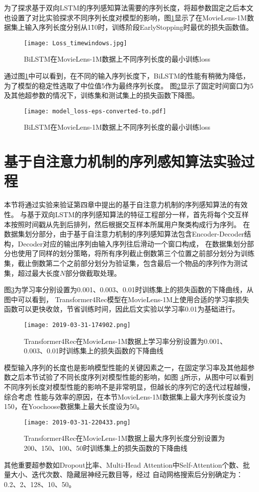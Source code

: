 为了探求基于双向LSTM的序列感知算法需要的序列长度，将超参数固定之后本文也设置了对比实验探求不同序列长度对模型的影响，图\ref{fig:windows}显示了在MovieLens-1M数据集上输入序列长度分别从1\~10时，训练阶段EarlyStopping时最优的损失函数值。
\begin{figure}[htb]%
  \centering
  \texttt{[image: Loss\_timewindows.jpg]}
  \caption{BiLSTM在MovieLens-1M数据上不同序列长度的最小训练loss}
  \label{fig:windows}
\end{figure}
通过图\ref{fig:windows}中可以看到，在不同的输入序列长度下，BiLSTM的性能有稍微为降低，为了模型的稳定性选取了中位值5作为最终序列长度。
图\ref{fig:BiLSTMloss}显示了固定时间窗口为5及其他超参数的情况下，训练集和测试集上的损失函数下降图。
\begin{figure}[htb]%
  \centering
  \texttt{[image: model\_loss-eps-converted-to.pdf]}
  \caption{BiLSTM在MovieLens-1M数据上不同序列长度的最小训练loss}
  \label{fig:BiLSTMloss}
\end{figure}

\section{基于自注意力机制的序列感知算法实验过程}
本节将通过实验来验证第四章中提出的基于自注意力机制的序列感知算法的有效性。
与基于双向LSTM的序列感知算法的特征工程部分一样，首先将每个交互样本按照时间戳从先到后排列，然后根据交互样本所属用户聚类构成行为序列。
在数据集划分部分，由于基于自注意力机制的序列感知算法包含Encoder-Decoder结构，Decoder对应的输出序列由输入序列往后滑动一个窗口构成，
在数据集划分部分也使用了同样的划分策略，将所有序列截止倒数第三个位置之前部分划分为训练集，截止倒数第二个之前部分划分为验证集，包含最后一个物品的序列作为测试集，超过最大长度$N$部分做截取处理。

图\ref{fig:Slefattentionloss}为学习率分别设置为0.001、0.003、0.01时训练集上的损失函数的下降曲线，从图中可以看到，
Transformer4Rec模型在MovieLens-1M上使用合适的学习率损失函数可以更快收敛，节省训练时间，因此后文实验以学习率0.01为基础进行。
\begin{figure}[htb]%
  \centering
  \texttt{[image: 2019-03-31-174902.png]}
  \caption{Transformer4Rec在MovieLens-1M数据上学习率分别设置为0.001、0.003、0.01时训练集上的损失函数的下降曲线}
  \label{fig:Slefattentionloss}
\end{figure}

模型输入序列的长度也是影响模型性能的关键因素之一，在固定学习率及其他超参数之后本节试验了不同长度序列对模型性能的影响，如图
\ref{fig:maxlenloss}所示，从图中可以看到不同序列长度对模型性能的影响不是非常明显，但越长的序列它的迭代过程越慢，综合考虑
性能与效率的原因，在本节MovieLens-1M数据集上最大序列长度设为150，在Yoochoose数据集上最大长度设为50。
\begin{figure}[htb]%
  \centering
  \texttt{[image: 2019-03-31-220433.png]}
  \caption{Transformer4Rec在MovieLens-1M数据上最大序列长度分别设置为200、150、100、50时训练集上的损失函数的下降曲线}
  \label{fig:maxlenloss}
\end{figure}
其他重要超参数如Dropout比率、Multi-Head Attention中Self-Attention个数、批量大小、迭代次数、隐藏层神经元数目等，经过
自动网格搜索后分别确定为：0.2、2、128、10、50。

